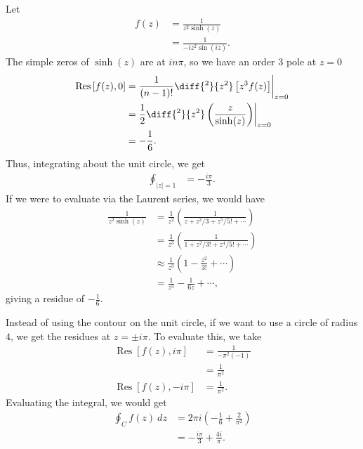 \documentclass[10pt]{mypackage}
\DeclareMathOperator{\res}{Res}
\begin{document}
\begin{example}
  Let
  \begin{align*}
    f(z) &= \frac{1}{z^2\sinh(z)}\\
         &= \frac{1}{-iz^2\sin\left( iz \right)}.
  \end{align*}
  The simple zeros of $\sinh(z)$ are at $in\pi$, so we have an order $3$ pole at $z = 0$
  \begin{align*}
    \res\left[ f(z),0 \right] &= \frac{1}{\left( n-1 \right)!} \diff{^{2}}{z^2} \left[ z^3f(z) \right]\biggr\vert_{z=0}\\
                              &= \frac{1}{2}\diff{^2}{z^2}\left( \frac{z}{\sinh(z)} \right)\biggr\vert_{z=0}\\
                              &= -\frac{1}{6}.
  \end{align*}
  Thus, integrating about the unit circle, we get
  \begin{align*}
    \oint_{\left\vert z \right\vert = 1} &= -\frac{i\pi}{3}.
  \end{align*}
  If we were to evaluate via the Laurent series, we would have
  \begin{align*}
    \frac{1}{z^2\sinh(z)} &= \frac{1}{z^2}\left( \frac{1}{z + z^2/3 + z^5/5! + \cdots} \right)\\
                          &= \frac{1}{z^3}\left( \frac{1}{1 + z^2/3! + z^4/5! + \cdots} \right)\\
                          &\approx \frac{1}{z^3}\left( 1 - \frac{z^2}{3!} + \cdots \right)\\
                          &= \frac{1}{z^3} - \frac{1}{6z} + \cdots,
  \end{align*}
  giving a residue of $-\frac{1}{6}$.\newline

  Instead of using the contour on the unit circle, if we want to use a circle of radius $4$, we get the residues at $z = \pm i\pi$. To evaluate this, we take
  \begin{align*}
    \res\left[ f(z),i\pi \right] &= \frac{1}{-\pi^2\left( -1 \right)}\\
                                 &= \frac{1}{\pi^2}\\
    \res\left[ f(z),-i\pi \right] &= \frac{1}{\pi^2}.
  \end{align*}
  Evaluating the integral, we would get
  \begin{align*}
    \oint_{C}f(z)\:dz &= 2\pi i \left( -\frac{1}{6} + \frac{2}{\pi^2} \right)\\
                      &= -\frac{i\pi}{3} + \frac{4i}{\pi}.
  \end{align*}
\end{example}
\end{document}
